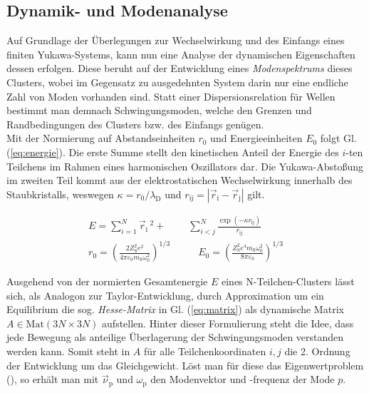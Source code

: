 \documentclass[numbers=noenddot,a4paper,notitlepage,twoside,BCOR15mm]{scrbook}
\newcommand{\ix}[1]{_\text{#1}}
\newcommand{\tilt}[1]{\textit{#1}}
\begin{document}
				\subsection{Dynamik- und Modenanalyse} \label{subsub:moden}

					Auf Grundlage der Überlegungen zur Wechselwirkung und des Einfangs eines finiten Yukawa-Systems, kann nun eine Analyse der dynamischen Eigenschaften dessen erfolgen. Diese beruht auf der Entwicklung eines \tilt{Modenspektrums} dieses Clusters, wobei im Gegensatz zu ausgedehnten System darin nur eine endliche Zahl von Moden vorhanden sind. Statt einer Dispersionsrelation für Wellen bestimmt man demnach Schwingungsmoden, welche den Grenzen und Randbedingungen des Clusters bzw. des Einfangs genügen.\\
					Mit der Normierung auf Abstandseinheiten $r\ix{0}$ und Energieeinheiten $E\ix{0}$ folgt Gl. (\ref{eq:energie}). Die erste Summe stellt den kinetischen Anteil der Energie des $i$-ten Teilchens im Rahmen eines harmonischen Oszillators dar. Die Yukawa-Abstoßung im zweiten Teil kommt aus der elektrostatischen Wechselwirkung innerhalb des Staubkristalls, weswegen $\kappa=r\ix{0}/\lambda\ix{D}$ und $r\ix{ij}=|\vec{r}\ix{i}-\vec{r}\ix{j}|$ gilt.

						\begin{align}
							E=\sum_{i=1}^{N}\vec{r}\ix{i}\,^2+&\sum_{i<j}^{N}\frac{\exp\left(-\kappa r\ix{ij}\right)}{r\ix{ij}} \label{eq:energie} \\
							r\ix{0}=\left(\frac{2Z\ix{S}^2e^2}{4\pi\varepsilon\ix{0}m\ix{S}\omega\ix{0}^2}\right)^{1/3} \quad &\quad E\ix{0}=\left(\frac{Z\ix{S}^2e^4m\ix{S}\omega\ix{0}^2}{8\pi\varepsilon\ix{0}}\right)^{1/3} \nonumber
						\end{align}

					Ausgehend von der normierten Gesamtenergie $E$ eines N-Teilchen-Clusters lässt sich, als Analogon zur Taylor-Entwicklung, durch Approximation um ein Equilibrium die sog. \tilt{Hesse-Matrix} in Gl. (\ref{eq:matrix}) als dynamische Matrix $A\in\text{Mat}\left(3N\times3N\right)$ aufstellen. Hinter dieser Formulierung steht die Idee, dass jede Bewegung als anteilige Überlagerung der Schwingungsmoden verstanden werden kann. Somit steht in $A$ für alle Teilchenkoordinaten $i,j$ die 2. Ordnung der Entwicklung um das Gleichgewicht. Löst man für diese das Eigenwertproblem (\cite{Schweigert95c}), so erhält man mit $\vec{\nu}\ix{p}$ und $\omega\ix{p}$ den Modenvektor und -frequenz der Mode $p$.
\end{document}
